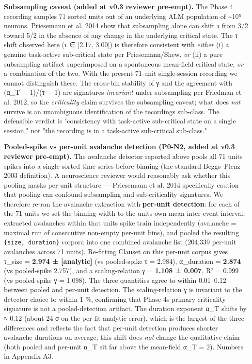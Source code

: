 \documentclass[
  11pt]{article}
\begin{document}
\textbf{Subsampling caveat (added at v0.3 reviewer pre-empt).} The Phase
4 recording samples 71 sorted units out of an underlying ALM population
of \textasciitilde10⁵ neurons. Priesemann et al. 2014 show that
subsampling alone can shift τ from 3/2 toward 5/2 in the absence of any
change in the underlying critical state. The τ shift observed here (τ ∈
{[}2.17, 3.00{]}) is therefore consistent with \emph{either} (i) a
genuine task-active sub-critical state per Priesemann/Shew, \emph{or}
(ii) a pure subsampling artifact superimposed on a spontaneous
mean-field critical state, \emph{or} a combination of the two. With the
present 71-unit single-session recording we cannot distinguish these.
The cross-bin stability of γ and the agreement with (α\_T − 1)/(τ − 1)
are signatures \emph{invariant} under subsampling per Friedman et al.
2012, so the \emph{criticality} claim survives the subsampling caveat;
what does \emph{not} survive is an unambiguous identification of the
recording\textquotesingle s sub-class. The defensible verdict is
"consistency with task-active sub-critical state on a single session,"
not "the recording is in a task-active sub-critical sub-class."

\textbf{Pooled-spike vs per-unit avalanche detection (P0-N2, added at
v0.3 reviewer pre-empt).} The avalanche detector reported above pools
all 71 units\textquotesingle{} spikes into a single sorted time series
before binning (the standard Beggs--Plenz 2003 definition). A
neuroscience reviewer would reasonably ask whether this pooling masks
per-unit structure --- Priesemann et al. 2014 specifically caution that
pooling can confound subsampling and sub-criticality signatures. We
therefore re-ran the avalanche extraction with \textbf{per-unit
detection}: for each of the 71 units we set the binning width to the
unit\textquotesingle s own mean inter-event interval, extracted
avalanches within that unit\textquotesingle s spike train independently
(avalanche = maximal run of consecutive non-empty per-unit bins), and
pooled the resulting \texttt{\{size,\ duration\}} corpora into one
combined avalanche list (204,339 per-unit avalanches across 71 units).
Re-fitting Clauset on this per-unit corpus gives τ\_size = \textbf{2.974
± {[}analytic{]}} (vs pooled-spike τ = 2.984), α\_duration =
\textbf{2.874} (vs pooled-spike 2.757), and a scaling-relation γ =
\textbf{1.108 ± 0.007}, R² = 0.999 (vs pooled-spike γ = 1.098). The
three quantities agree to within 0.01--0.12 between pooled and per-unit
detection. The scaling-relation γ is invariant to the detector choice to
within 1 \%, confirming that Phase 4\textquotesingle s primary
criticality signature is not a pooled-detection artifact. The duration
exponent α\_T shifts by ≈ 0.12 (about 24 σ on the per-fit analytic
error), which is the largest of the three differences and reflects the
fact that per-unit detection produces shorter avalanche durations on
average; this shift does \emph{not} change the qualitative claim (both
pooled and per-unit α\_T sit far above the mean-field α\_T = 2). Numbers
in Appendix A3.
\end{document}
